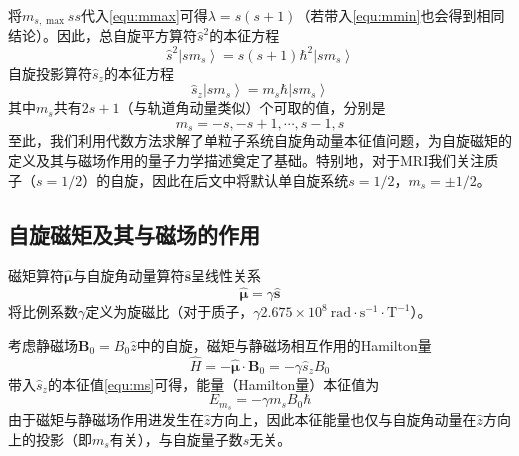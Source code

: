 \documentclass[12pt]{article}
\begin{document}
将$m_{s,\max}ss$代入\autoref{equ:mmax}可得$\lambda=s(s+1)$（若带入\autoref{equ:mmin}也会得到相同结论）。因此，总自旋平方算符$\hat{s}^2$的本征方程
\begin{equation}
    \boxed{\hat{s}^2\left|sm_s\right\rangle=s(s+1)\hbar^2\left|sm_s\right\rangle}
\end{equation}
自旋投影算符$\hat{s}_z$的本征方程
\begin{equation}
    \boxed{\hat{s}_z\left|sm_s\right\rangle=m_s\hbar\left|sm_s\right\rangle}
\end{equation}
其中$m_s$共有$2s+1$（与轨道角动量类似）个可取的值，分别是
\begin{equation}
    m_s=-s,-s+1,\cdots,s-1,s
    \label{equ:ms}
\end{equation}
至此，我们利用代数方法求解了单粒子系统自旋角动量本征值问题，为自旋磁矩的定义及其与磁场作用的量子力学描述奠定了基础。特别地，对于MRI我们关注质子（$s=1/2$）的自旋，因此在后文中将默认单自旋系统$s=1/2$，$m_s=\pm1/2$。

\subsection{自旋磁矩及其与磁场的作用}
磁矩算符$\bm{\hat{\mu}}$与自旋角动量算符$\bm{\hat{s}}$呈线性关系
\begin{equation}
    \bm{\hat{\mu}}=\gamma\bm{\hat{s}}
    \label{equ:gamma}
\end{equation}
将比例系数$\gamma$定义为旋磁比（对于质子，$\gamma2.675\times10^8\ \mathrm{rad\cdot s^{-1}\cdot T^{-1}}$）。

考虑静磁场$\bm{B}_0=B_0\hat{z}$中的自旋，磁矩与静磁场相互作用的Hamilton量
\begin{equation}
    \hat{H}=-\bm{\hat{\mu}}\cdot\bm{B}_0=-\gamma\hat{s}_zB_0
\end{equation}
带入$\hat{s}_z$的本征值\autoref{equ:ms}可得，能量（Hamilton量）本征值为
\begin{equation}
    E_{m_s}=-\gamma m_sB_0\hbar
\end{equation}
由于磁矩与静磁场作用进发生在$\hat{z}$方向上，因此本征能量也仅与自旋角动量在$\hat{z}$方向上的投影（即$m_s$有关），与自旋量子数$s$无关。
\end{document}
